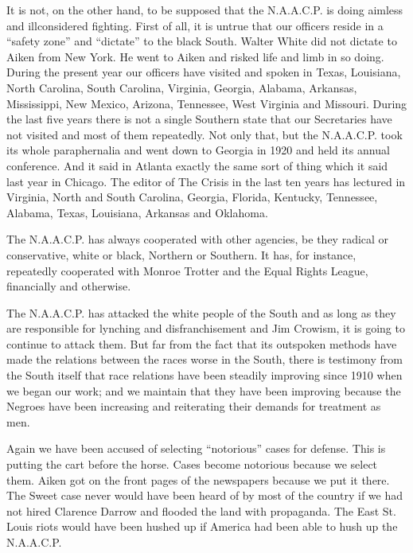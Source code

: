 \documentclass[letterpaper,10pt,english]{jupyterBook}
\begin{document}
\sphinxAtStartPar
It is not, on the other hand, to be supposed that the N.A.A.C.P. is doing aimless and ill\sphinxhyphen{}considered fighting. First of all, it is untrue that our officers reside in a “safety zone” and “dictate” to the black South. Walter White did not dictate to Aiken from New York. He went to Aiken and risked life and limb in so doing. During the present year our officers have visited and spoken in Texas, Louisiana, North Carolina, South Carolina, Virginia, Georgia, Alabama, Arkansas, Mississippi, New Mexico, Arizona, Tennessee, West Virginia and Missouri. During the last five years there is not a single Southern state that our Secretaries have not visited and most of them repeatedly. Not only that, but the N.A.A.C.P. took its whole paraphernalia and went down to Georgia in 1920 and held its annual conference. And it said in Atlanta exactly the same sort of thing which it said last year in Chicago. The editor of The Crisis in the last ten years has lectured in Virginia, North and South Carolina, Georgia, Florida, Kentucky, Tennessee, Alabama, Texas, Louisiana, Arkansas and Oklahoma.

\sphinxAtStartPar
The N.A.A.C.P. has always cooperated with other agencies, be they radical or conservative, white or black, Northern or Southern. It has, for instance, repeatedly cooperated with Monroe Trotter and the Equal Rights League, financially and otherwise.

\sphinxAtStartPar
The N.A.A.C.P. has attacked the white people of the South and as long as they are responsible for lynching and disfranchisement and Jim Crowism, it is going to continue to attack them. But far from the fact that its outspoken methods have made the relations between the races worse in the South, there is testimony from the South itself that race relations have been steadily improving since 1910 when we began our work; and we maintain that they have been improving because the Negroes have been increasing and reiterating their demands for treatment as men.

\sphinxAtStartPar
Again we have been accused of selecting “notorious” cases for defense. This is putting the cart before the horse. Cases become notorious because we select them. Aiken got on the front pages of the newspapers because we put it there. The Sweet case never would have been heard of by most of the country if we had not hired Clarence Darrow and flooded the land with propaganda. The East St. Louis riots would have been hushed up if America had been able to hush up the N.A.A.C.P.
\end{document}
